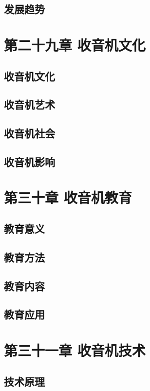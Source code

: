\documentclass[12pt,UTF8]{ctexbook}
\begin{document}
\section{发展趋势}

\chapter{第二十九章 收音机文化}

\section{收音机文化}
\section{收音机艺术}
\section{收音机社会}
\section{收音机影响}

\chapter{第三十章 收音机教育}

\section{教育意义}
\section{教育方法}
\section{教育内容}
\section{教育应用}

\chapter{第三十一章 收音机技术}

\section{技术原理}
\end{document}
